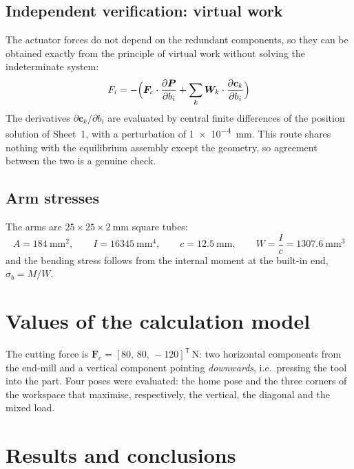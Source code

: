 \documentclass[11pt]{article}
\begin{document}
\subsection{Independent verification: virtual work}

The actuator forces do not depend on the redundant components, so they can be obtained
exactly from the principle of virtual work without solving the indeterminate system:
\begin{equation}
F_i = -\Bigl(\bm F_c\cdot\frac{\partial\bm P}{\partial b_i}
      + \sum_k \bm W_k\cdot\frac{\partial\bm c_k}{\partial b_i}\Bigr)
\label{eq:vw}
\end{equation}
The derivatives $\partial\bm c_k/\partial b_i$ are evaluated by central finite differences
of the position solution of Sheet~1, with a perturbation of \SI{1e-4}{\milli\metre}. This
route shares nothing with the equilibrium assembly except the geometry, so agreement
between the two is a genuine check.

\subsection{Arm stresses}

The arms are $25\times25\times\SI{2}{\milli\metre}$ square tubes:
\begin{equation}
A=\SI{184}{\milli\metre\squared},\qquad
I=\SI{16345}{\milli\metre\tothe{4}},\qquad
c=\SI{12.5}{\milli\metre},\qquad
W=\frac{I}{c}=\SI{1307.6}{\milli\metre\cubed}
\end{equation}
and the bending stress follows from the internal moment at the built-in end,
$\sigma_b=M/W$.

\section{Values of the calculation model}\label{sec:sta-val}

The cutting force is $\bm F_c=[80,\,80,\,-120]^{\mathsf T}$\,\si{\newton}: two horizontal
components from the end-mill and a vertical component pointing \emph{downwards}, i.e.\
pressing the tool into the part. Four poses were evaluated: the home pose and the three
corners of the workspace that maximise, respectively, the vertical, the diagonal and the
mixed load.

\section{Results and conclusions}\label{sec:sta-res}
\end{document}
